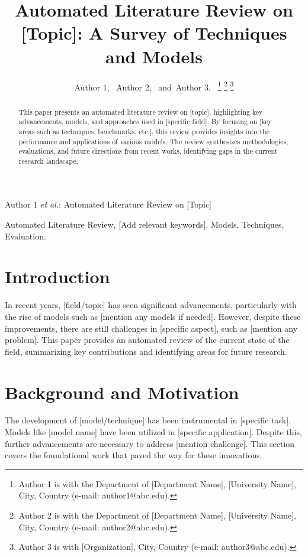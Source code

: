 \documentclass[journal]{IEEEtran}
\begin{document}
\title{Automated Literature Review on [Topic]: A Survey of Techniques and Models}

\author{Author 1,~
        Author 2,~
        and~Author 3,~%
\thanks{Author 1 is with the Department of [Department Name], [University Name], City, Country (e-mail: author1@abc.edu).}%
\thanks{Author 2 is with the Department of [Department Name], [University Name], City, Country (e-mail: author2@abc.edu).}%
\thanks{Author 3 is with [Organization], City, Country (e-mail: author3@abc.edu).}%
}

%
{Author 1 \MakeLowercase{\textit{et al.}}: Automated Literature Review on [Topic]}

\maketitle

\begin{abstract}
This paper presents an automated literature review on [topic], highlighting key advancements, models, and approaches used in [specific field]. By focusing on [key areas such as techniques, benchmarks, etc.], this review provides insights into the performance and applications of various models. The review synthesizes methodologies, evaluations, and future directions from recent works, identifying gaps in the current research landscape.
\end{abstract}

\begin{IEEEkeywords}
Automated Literature Review, [Add relevant keywords], Models, Techniques, Evaluation.
\end{IEEEkeywords}

\section{Introduction}
In recent years, [field/topic] has seen significant advancements, particularly with the rise of models such as [mention any models if needed]. However, despite these improvements, there are still challenges in [specific aspect], such as [mention any problem]. This paper provides an automated review of the current state of the field, summarizing key contributions and identifying areas for future research.

\section{Background and Motivation}
The development of [model/technique] has been instrumental in [specific task]. Models like [model name] have been utilized in [specific application]. Despite this, further advancements are necessary to address [mention challenge]. This section covers the foundational work that paved the way for these innovations.
\end{document}
